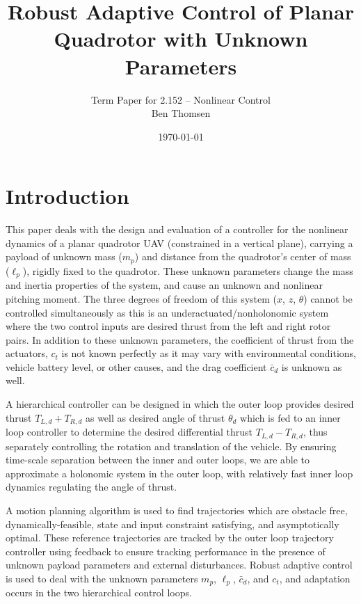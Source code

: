 \documentclass[letterpaper, 10 pt, conference]{ieeeconf}\usepackage[margin=1in]{geometry}
\title{\LARGE \bf Robust Adaptive Control of Planar Quadrotor with Unknown Parameters}
\author{Term Paper for 2.152 -- Nonlinear Control\\ Ben Thomsen}
\date{\today}
\begin{document}
\maketitle

\section{Introduction}
This paper deals with the design and evaluation of a controller for the nonlinear dynamics of a planar quadrotor UAV (constrained in a vertical plane), carrying a payload of unknown mass ($m_p$) and distance from the quadrotor's center of mass ($\ell_p$), rigidly fixed to the quadrotor. These unknown parameters change the mass and inertia properties of the system, and cause an unknown and nonlinear pitching moment. The three degrees of freedom of this system ($x$, $z$, $\theta$) cannot be controlled simultaneously as this is an underactuated/nonholonomic system where the two control inputs are desired thrust from the left and right rotor pairs. In addition to these unknown parameters, the coefficient of thrust from the actuators, $c_t$ is not known perfectly as it may vary with environmental conditions, vehicle battery level, or other causes, and the drag coefficient $\bar{c}_d$ is unknown as well. 

A hierarchical controller can be designed in which the outer loop provides desired thrust $T_{L,d} + T_{R,d}$ as well as desired angle of thrust $\theta_d$ which is fed to an inner loop controller to determine the desired differential thrust $T_{L,d} - T_{R,d}$, thus separately controlling the rotation and translation of the vehicle. By ensuring time-scale separation between the inner and outer loops, we are able to approximate a holonomic system in the outer loop, with relatively fast inner loop dynamics regulating the angle of thrust.

A motion planning algorithm is used to find trajectories which are obstacle free, dynamically-feasible, state and input constraint satisfying, and asymptotically optimal. These reference trajectories are tracked by the outer loop trajectory controller using feedback to ensure tracking performance in the presence of unknown payload parameters and external disturbances. Robust adaptive control is used to deal with the unknown parameters $m_p$, $\ell_p$, $\bar{c}_d$, and $c_t$, and adaptation occurs in the two hierarchical control loops. 
\end{document}
